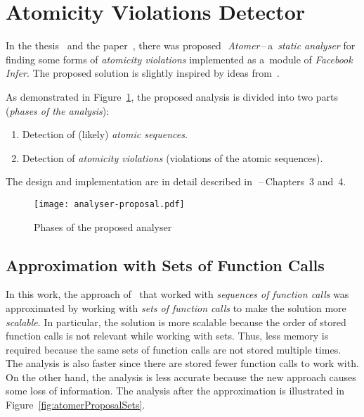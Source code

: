 
\section{Atomicity Violations Detector}
\label{sec:atomer}

In the thesis~\cite{harmimBP} and the paper~\cite{excel2019FBInfer}, there
was proposed\ \,\emph{Atomer}\,--\,a~\emph{static analyser} for finding some
forms of \emph{atomicity violations} implemented as a~module of \emph{Facebook
Infer}. The proposed solution is slightly inspired by ideas from~\cite{contract,
contracts2017, contracts2015, muzikovskaBP, excel2018Muzikovska}.

As demonstrated in Figure~\ref{fig:atomerProposal}, the proposed analysis is
divided into two parts (\emph{phases of the analysis}):
\begin{enumerate}[label={\textbf{Phase~\arabic*}:}, leftmargin=5em]
    \item
        Detection of (likely) \emph{atomic sequences}.

    \item
        Detection of \emph{atomicity violations} (violations of the atomic
        sequences).
\end{enumerate}
The design and implementation are in detail described
in~\cite{harmimBP}\,--\,Chapters~3 and~4.

\begin{figure}[hbt]
    \centering
    \texttt{[image: analyser-proposal.pdf]}
    \caption{Phases of the proposed analyser}
    \label{fig:atomerProposal}
\end{figure}

\subsection{\sloppy%
    Approximation with Sets of Function Calls%
}

In this work, the approach of~\cite{harmimBP} that worked with \emph{sequences
of function calls} was approximated by working with \emph{sets of function
calls} to make the solution more \emph{scalable}. In particular, the solution
is more scalable because the order of stored function calls is not relevant
while working with sets. Thus, less memory is required because the same sets
of function calls are not stored multiple times. The analysis is also faster
since there are stored fewer function calls to work with. On the other hand,
the analysis is less accurate because the new approach causes some loss of
information. The analysis after the approximation is illustrated in
Figure~\ref{fig:atomerProposalSets}.

